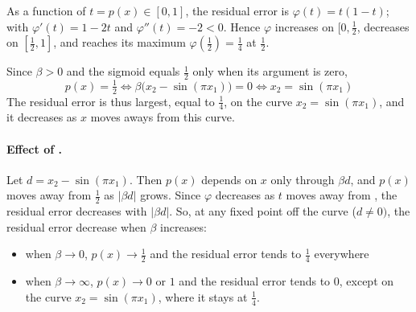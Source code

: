 


As a function of $t=p(x)\in[0,1]$, the residual error is $\varphi(t) = t(1-t)$; with $\varphi'(t)=1-2t$ and $\varphi''(t)=-2<0$. Hence $\varphi$ increases on $[0,\tfrac12$, decreases on $[\tfrac12,1]$, and reaches its maximum $\varphi(\tfrac12)=\tfrac14$ at $\tfrac12$.

Since $\beta>0$ and the sigmoid equals $\tfrac12$ only when its argument is zero,
\[
p(x)=\tfrac12\Leftrightarrow\beta\big(x_2-\sin(\pi x_1)\big)=0\Leftrightarrow x_2=\sin(\pi x_1)
\]
The residual error is thus largest, equal to $\tfrac14$, on the curve $x_2=\sin(\pi x_1)$, and it decreases as $x$ moves aways from this curve.
\paragraph{Effect of \beta.}
Let $d=x_2-\sin(\pi x_1)$. Then $p(x)$ depends on $x$ only through $\beta d$, and $p(x)$ moves away from $\tfrac12$ as $|\beta d|$ grows. Since $\varphi$ decreases as $t$ moves away from , the residual error decreases with $|\beta d|$. So, at any fixed point off the curve ($d\neq 0)$, the residual error decrease when $\beta$ increases: \begin{itemize}
    \item when $\beta \to 0$, $p(x) \to \tfrac12$ and the residual error tends to $\tfrac14$ everywhere
    \item when $\beta \to \infty$, $p(x) \to 0$ or $1$ and the residual error tends to $0$, except on the curve $x_2=\sin(\pi x_1)$, where it stays at $\tfrac14$.
\end{itemize}

